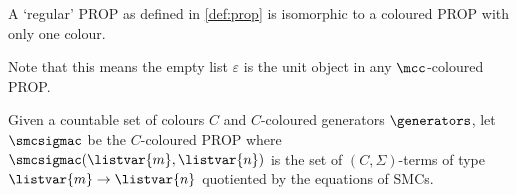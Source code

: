\begin{remark}
    A `regular' PROP as defined in \cref{def:prop} is isomorphic to a
    coloured PROP with only one colour.
\end{remark}

Note that this means the empty list \(\varepsilon\) is the unit
object in any \(\mcc\)-coloured PROP.

\begin{definition}\label{def:freely-generated-coloured-prop}
    Given a countable set of colours \(C\) and \(C\)-coloured generators
    \(\generators\), let \(\smcsigmac\) be the \(C\)-coloured PROP where
    \(\smcsigmac(\listvar{m}, \listvar{n})\) is the set of
    \((C,\Sigma)\)-terms of type \(\listvar{m} \to \listvar{n}\) quotiented by
    the equations of SMCs.
\end{definition}
